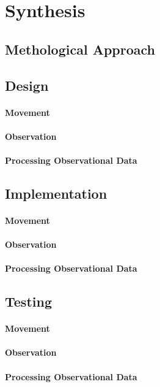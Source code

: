 \part{Synthesis}
	\chapter{Methological Approach}
	
	\chapter{Design}
		\subsection{Movement}
		\subsection{Observation}
		\subsection{Processing Observational Data}
		
	\chapter{Implementation}
		\subsection{Movement}
		\subsection{Observation}
		\subsection{Processing Observational Data}
		
	\chapter{Testing}
		\subsection{Movement}
		\subsection{Observation}
		\subsection{Processing Observational Data}
